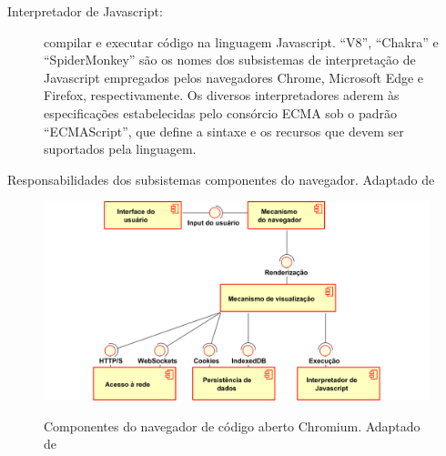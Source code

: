 \begin{quadro}[h]
\begin{framed}
{\begin{description}
		\item [Interpretador de Javascript:] compilar e executar código na linguagem Javascript. ``V8'', ``Chakra'' e ``SpiderMonkey'' são os nomes dos subsistemas de interpretação de Javascript empregados pelos navegadores Chrome, Microsoft Edge e Firefox, respectivamente. Os diversos interpretadores aderem às especificações estabelecidas pelo consórcio ECMA sob o padrão ``ECMAScript'', que define a sintaxe e os recursos que devem ser suportados pela linguagem.
	\end{description}}
	\end{framed}
	\caption[Responsabilidades dos subsistemas componentes do navegador]{Responsabilidades dos subsistemas componentes do navegador. Adaptado de \cite{HTML5Rocks2011}}
	\label{Box: browserComponents}
\end{quadro}



\begin{figure}[h]
	\centering
	\includegraphics[width=12cm]{diagramas/componentes-navegador.png}
	\label{Fig: diagrama03}
	\caption[Componentes do navegador de código aberto Chromium]{Componentes do navegador de código aberto Chromium. Adaptado de \cite{Chromium2018_MPA, Chromium2018_MPRL, HTML5Rocks2011}}
\end{figure}


